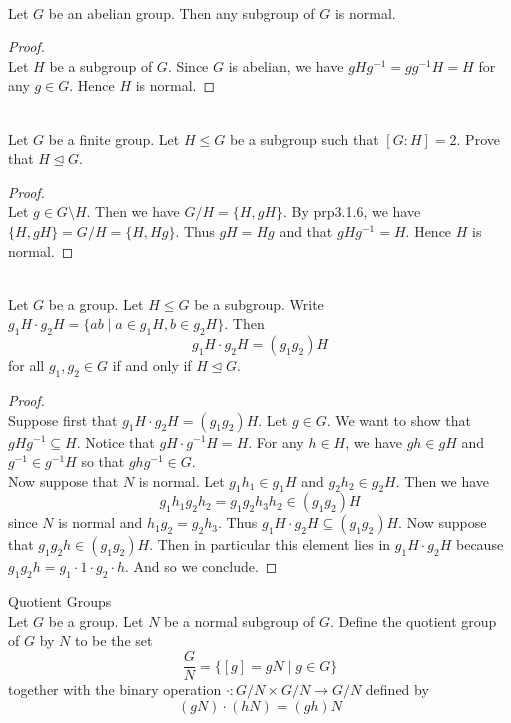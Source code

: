 \documentclass[a4paper]{article}
\begin{document}
\begin{eg}{}{}\\
Let $G$ be an abelian group. Then any subgroup of $G$ is normal. 
\begin{proof}\\
Let $H$ be a subgroup of $G$. Since $G$ is abelian, we have $gHg^{-1}=gg^{-1}H=H$ for any $g\in G$. Hence $H$ is normal. 
\end{proof}
\end{eg}

\begin{eg}{}{}\\
Let $G$ be a finite group. Let $H\leq G$ be a subgroup such that $[G:H]=2$. Prove that $H\trianglelefteq G$. 
\begin{proof}\\
Let $g\in G\setminus H$. Then we have $G/H=\{H,gH\}$. By prp3.1.6, we have $\{H,gH\}=G/H=\{H,Hg\}$. Thus $gH=Hg$ and that $gHg^{-1}=H$. Hence $H$ is normal. 
\end{proof}
\end{eg}

\begin{prp}{}{}\\
Let $G$ be a group. Let $H\leq G$ be a subgroup. Write $g_1H\cdot g_2H=\{ab\;|\;a\in g_1H,b\in g_2H\}$. Then $$g_1H\cdot g_2H=(g_1g_2)H$$ for all $g_1,g_2\in G$ if and only if $H\trianglelefteq G$. 
\begin{proof}\\
Suppose first that $g_1H\cdot g_2H=(g_1g_2)H$. Let $g\in G$. We want to show that $gHg^{-1}\subseteq H$. Notice that $gH\cdot g^{-1}H=H$. For any $h\in H$, we have $gh\in gH$ and $g^{-1}\in g^{-1}H$ so that $ghg^{-1}\in G$. \\

Now suppose that $N$ is normal. Let $g_1h_1\in g_1H$ and $g_2h_2\in g_2H$. Then we have $$g_1h_1g_2h_2=g_1g_2h_3h_2\in(g_1g_2)H$$ since $N$ is normal and $h_1g_2=g_2h_3$. Thus $g_1H\cdot g_2H\subseteq(g_1g_2)H$. Now suppose that $g_1g_2h\in(g_1g_2)H$. Then in particular this element lies in $g_1H\cdot g_2 H$ because $g_1g_2h=g_1\cdot 1\cdot g_2\cdot h$. And so we conclude. 
\end{proof}
\end{prp}

\begin{defn}{Quotient Groups}{}\\
Let $G$ be a group. Let $N$ be a normal subgroup of $G$. Define the quotient group of $G$ by $N$ to be the set $$\frac{G}{N}=\{[g]=gN\;|\;g\in G\}$$ together with the binary operation $\cdot:G/N\times G/N\to G/N$ defined by $$(gN)\cdot(hN)=(gh)N$$
\end{defn}
\end{document}
